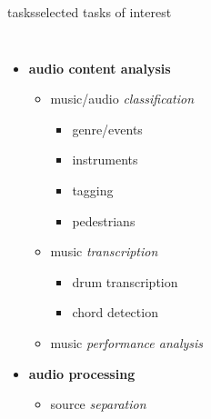         \begin{frame}{tasks}{selected tasks of interest}
            \vspace{-9mm}
            \begin{columns}
            \begin{itemize}
                \item   \textbf{audio content analysis} \cite{lerch_introduction_2023}
                    \begin{itemize}
                        \item   music/audio \textit{classification}
                            \begin{itemize}
                                \item genre/events \cite{burred_hierarchical_2004, hung_low-resource_2023}
                                \item instruments \cite{gururani_semi-supervised_2021, chen_music_2023, ding_audio_2023}
                                \item tagging \cite{ding_audio_2023, ding_embedding_2024, ma_music_2024}
                                \item pedestrians \cite{seshadri_asped_2024, han_understanding_2024}
                            \end{itemize}
                        \item   music \textit{transcription}
                            \begin{itemize}
                                \item drum transcription \cite{wu_review_2018}
                                \item chord detection \cite{zhou_chord_2015}
                            \end{itemize}
                        \item   music \textit{performance analysis} \cite{pati_assessment_2018}
                    \end{itemize}
                 \smallskip
                 \item<2->  \textbf{audio processing}
                    \begin{itemize}
                        \item   source \textit{separation} \cite{hung_multi-task_2020, watcharasupat_generalized_2024, watcharasupat_stem-agnostic_2024}
                    \end{itemize}
                 \smallskip

\end{itemize}
\end{columns}
\end{frame}
